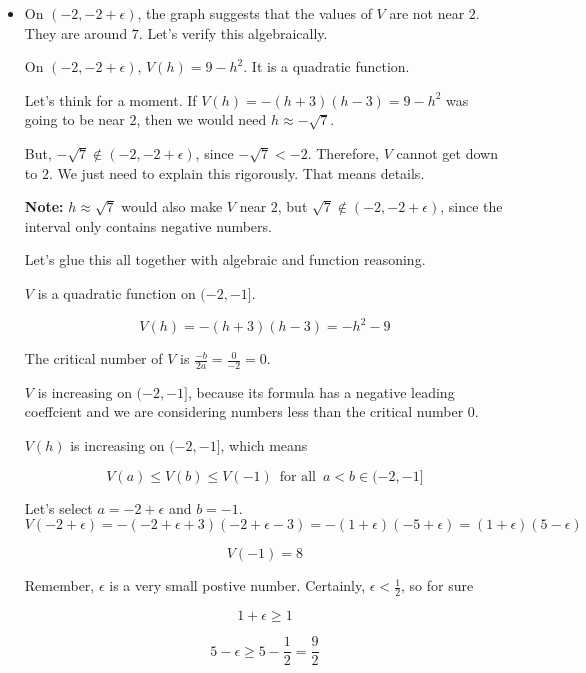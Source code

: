 \documentclass{ximera}
\begin{document}
\begin{explanation}
\begin{itemize}
\item On $(-2, -2 + \epsilon)$, the graph suggests that the values of $V$ are not near $2$.  They are around $7$. Let's verify this algebraically. 



On $(-2, -2 + \epsilon)$, $V(h) = 9 - h^2$. It is a quadratic function.  


Let's think for a moment.  If $V(h) = -(h + 3)(h - 3) = 9 - h^2$ was going to be near $2$, then we would need $h \approx -\sqrt{7}$.  

But, $-\sqrt{7} \notin (-2, -2 + \epsilon)$, since $-\sqrt{7} < -2$. Therefore, $V$ cannot get down to $2$. We just need to explain this rigorously. That means details.  

\textbf{Note:} $h \approx \sqrt{7}$ would also make $V$ near $2$, but $\sqrt{7} \notin (-2, -2 + \epsilon)$, since the interval only contains negative numbers.

Let's glue this all together with algebraic and function reasoning. 





$V$ is a quadratic function on $(-2, -1]$. 

  \[ V(h) = -(h + 3)(h - 3) = -h^2 -9 \]


The critical number of $V$ is $\frac{-b}{2a} = \frac{0}{-2} = 0$.


$V$ is increasing on $(-2, -1]$, because its formula has a negative leading coeffcient and we are considering numbers less than the critical number $0$.






$V(h)$ is increasing on $(-2, -1]$, which means 



\[ V(a) \leq V(b) \leq V(-1) \, \text{ for all } \, a < b \in (-2, -1] \]

Let's select $a = -2 + \epsilon$ and $b = -1$. \\

\[
V(-2 + \epsilon) = -(-2 + \epsilon + 3) (-2 + \epsilon - 3) = -(1 + \epsilon) (-5 + \epsilon) = (1 + \epsilon) (5 - \epsilon)
\]

\[
V(-1) = 8
\]


Remember, $\epsilon$ is a very small postive number.  Certainly, $\epsilon < \frac{1}{2}$, so for sure  


\[
1 + \epsilon \geq 1
\]

\[
5 -  \epsilon \geq 5 -  \frac{1}{2} = \frac{9}{2}
\]


\end{itemize}
\end{explanation}
\end{document}
